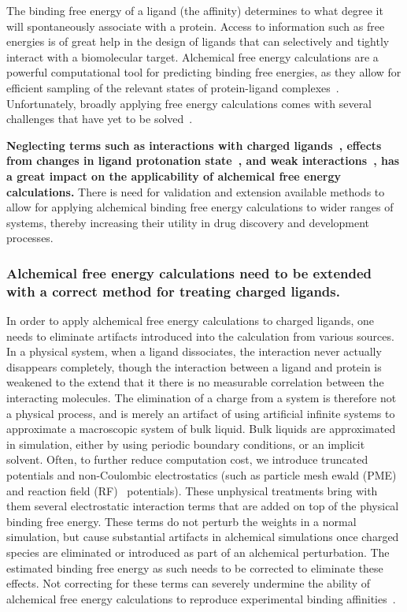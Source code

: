 \documentclass[10pt,final]{article}
\begin{document}
The binding free energy of a ligand (the affinity) determines to what degree it will spontaneously associate with a protein.
%
Access to information such as free energies is of great help in the design of ligands that can selectively and tightly interact with a biomolecular target.
%
Alchemical free energy calculations are a powerful computational tool for predicting binding free energies, as they allow for efficient sampling of the relevant states of protein-ligand complexes~\autocite{Shirts2007a}.
%
Unfortunately, broadly applying free energy calculations comes with several challenges that have yet to be solved~\autocite{Chodera2011a,Gapsys2015a}. 

%
\textbf{Neglecting terms such as interactions with charged ligands~\autocite{Rocklin2013b,Muddana2014a},
effects from changes in ligand protonation state~\autocite{Dullweber2001a,Aleksandrov2007a,Czodrowski2007a,Steuber2007a,Czodrowski2007b},
and weak interactions~\autocite{Gilson1997a}, has a great impact on the applicability of alchemical free energy calculations.
}%
There is need for validation  and extension available methods to allow for applying alchemical binding free energy calculations to wider ranges of systems,
thereby increasing their utility in drug discovery and development processes.


\subsubsection*{Alchemical free energy calculations need to be extended with a correct method for treating charged ligands.}
In order to apply alchemical free energy calculations to charged ligands, one needs to eliminate artifacts introduced into the calculation from various sources.
%
In a physical system, when a ligand dissociates, the interaction never actually disappears completely, though the interaction between a ligand and protein is weakened to the extend that it there is no measurable correlation between the interacting molecules.
%
The elimination of a charge from a system is therefore not a physical process, and is merely an artifact of using artificial infinite systems to approximate a macroscopic system of bulk liquid.
%
Bulk liquids are approximated in simulation, either by using periodic boundary conditions, or an implicit solvent.
%
Often, to further reduce computation cost, we introduce truncated potentials and non-Coulombic electrostatics (such as particle mesh ewald (PME)~\autocite{Essmann1995a} and reaction field (RF)~\autocite{Tironi1995a} potentials). 
%
These unphysical treatments bring with them several electrostatic interaction terms that are added on top of the physical binding free energy.
%
These terms do not perturb the weights in a normal simulation, but cause substantial artifacts in alchemical simulations once charged species are eliminated or introduced as part of an alchemical perturbation.
%
The estimated binding free energy as such needs to be corrected to eliminate these effects.
%
Not correcting for these terms can severely undermine the ability of alchemical free energy calculations to reproduce experimental binding affinities~\autocite{Rocklin2013b,Muddana2014a}.
\end{document}
